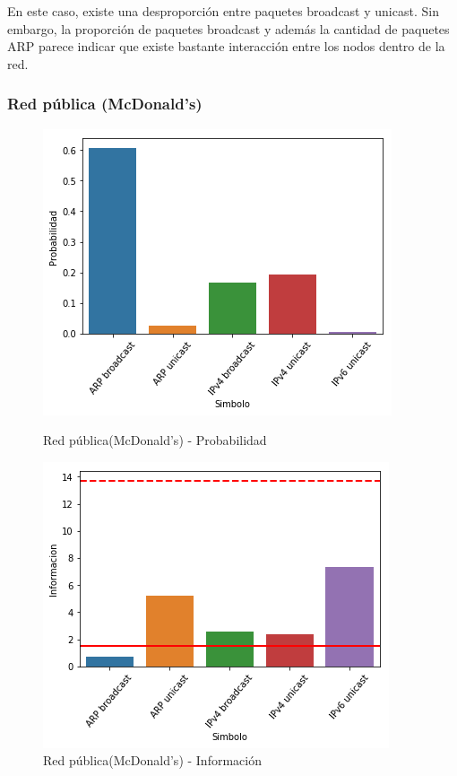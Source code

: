 En este caso, existe una desproporción entre paquetes broadcast y unicast. Sin embargo, la proporción de paquetes broadcast y además la cantidad de paquetes ARP parece indicar que existe bastante interacción entre los nodos dentro de la red.

\subsubsection{Red pública (McDonald's)}

\begin{figure}[H]
	\begin{minipage}{0.49\textwidth}
		\centering
		\includegraphics[width=\linewidth]{imagenes/mac_barras_prob}
		\caption{Red pública(McDonald's) - Probabilidad}
		\label{mac_barras_prob}		
	\end{minipage}
	\begin{minipage}{0.49\textwidth}
		\centering
		\includegraphics[width=\linewidth]{imagenes/mac_barras_info}
		\caption{Red pública(McDonald's) - Información}
		\label{mac_barras_info}		
	\end{minipage}
\end{figure}

